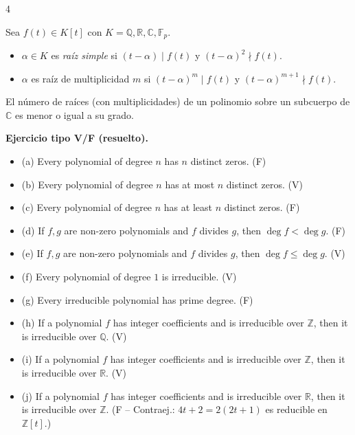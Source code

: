 \documentclass[landscape,a4paper]{article}
\begin{document}
\begin{multicols}{4}
\begin{tcolorbox}[colback=white,colframe=blue!80!black,colbacktitle=blue!80!black,
                  coltitle=white,title={Definición: Multiplicidad}]
Sea $f(t)\in K[t]$ con $K=\mathbb{Q},\mathbb{R},\mathbb{C},\mathbb{F}_p$.  
\begin{itemize}
  \item $\alpha\in K$ es \emph{raíz simple} si $(t-\alpha)\mid f(t)$ y $(t-\alpha)^2\nmid f(t).$
  \item $\alpha$ es raíz de multiplicidad $m$ si $(t-\alpha)^m\mid f(t)$ y $(t-\alpha)^{m+1}\nmid f(t).$
\end{itemize}
\end{tcolorbox}
\begin{tcolorbox}[colback=white,colframe=red!80!black,colbacktitle=red!80!black,
                  coltitle=white,title={Teorema}]
El número de raíces (con multiplicidades) de un polinomio sobre un subcuerpo de $\mathbb{C}$ es menor o igual a su grado.
\end{tcolorbox}
\noindent \textbf{Ejercicio tipo V/F (resuelto).}
  \begin{itemize}
    \item (a) Every polynomial of degree $n$ has $n$ distinct zeros. (F)
    \item (b) Every polynomial of degree $n$ has at most $n$ distinct zeros. (V)
    \item (c) Every polynomial of degree $n$ has at least $n$ distinct zeros. (F)
    \item (d) If $f,g$ are non-zero polynomials and $f$ divides $g$, then $\deg f < \deg g$. (F)
    \item (e) If $f,g$ are non-zero polynomials and $f$ divides $g$, then $\deg f \le \deg g$. (V)
    \item (f) Every polynomial of degree $1$ is irreducible. (V)
    \item (g) Every irreducible polynomial has prime degree. (F)
    \item (h) If a polynomial $f$ has integer coefficients and is irreducible over $\mathbb{Z}$, then it is irreducible over $\mathbb{Q}$. (V)
    \item (i) If a polynomial $f$ has integer coefficients and is irreducible over $\mathbb{Z}$, then it is irreducible over $\mathbb{R}$. (V)
    \item (j) If a polynomial $f$ has integer coefficients and is irreducible over $\mathbb{R}$, then it is irreducible over $\mathbb{Z}$. (F – Contraej.: $4t+2 = 2(2t+1)$ es reducible en $\mathbb{Z}[t]$.)
  \end{itemize}


\end{multicols}
\end{document}
